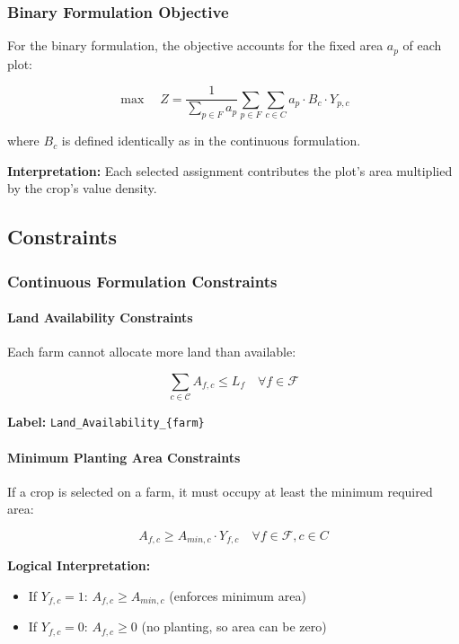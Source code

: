 \documentclass{article}
\begin{document}
\subsubsection{Binary Formulation Objective}

For the binary formulation, the objective accounts for the fixed area $a_p$ of each plot:

$$\max \quad Z = \frac{1}{\sum_{p \in F} a_p} \sum_{p \in F} \sum_{c \in C} a_p \cdot B_c \cdot Y_{p,c}$$

where $B_c$ is defined identically as in the continuous formulation.

\textbf{Interpretation:} Each selected assignment contributes the plot's area multiplied by the crop's value density.

\subsection{Constraints}

\subsubsection{Continuous Formulation Constraints}

\paragraph{Land Availability Constraints}

Each farm cannot allocate more land than available:

$$\sum_{c \in \mathcal{C}} A_{f,c} \leq L_f \quad \forall f \in \mathcal{F}$$

\textbf{Label:} \texttt{Land\_Availability\_\{farm\}}

\paragraph{Minimum Planting Area Constraints}

If a crop is selected on a farm, it must occupy at least the minimum required area:

$$A_{f,c} \geq A_{min,c} \cdot Y_{f,c} \quad \forall f \in \mathcal{F}, c \in C$$


\textbf{Logical Interpretation:}
\begin{itemize}
    \item If $Y_{f,c} = 1$: $A_{f,c} \geq A_{min,c}$ (enforces minimum area)
    \item If $Y_{f,c} = 0$: $A_{f,c} \geq 0$ (no planting, so area can be zero)
\end{itemize}
\end{document}

